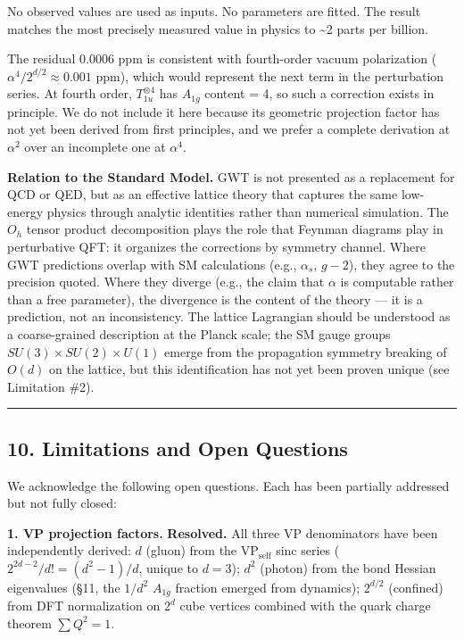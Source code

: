 \documentclass[
]{article}
\begin{document}
No observed values are used as inputs. No parameters are fitted. The
result matches the most precisely measured value in physics to
\textasciitilde2 parts per billion.

The residual 0.0006 ppm is consistent with fourth-order vacuum
polarization (\(\alpha^4/2^{d/2} \approx 0.001\) ppm), which would
represent the next term in the perturbation series. At fourth order,
\(T_{1u}^{\otimes 4}\) has \(A_{1g}\) content = 4, so such a correction
exists in principle. We do not include it here because its geometric
projection factor has not yet been derived from first principles, and we
prefer a complete derivation at \(\alpha^2\) over an incomplete one at
\(\alpha^4\).

\textbf{Relation to the Standard Model.} GWT is not presented as a
replacement for QCD or QED, but as an effective lattice theory that
captures the same low-energy physics through analytic identities rather
than numerical simulation. The \(O_h\) tensor product decomposition
plays the role that Feynman diagrams play in perturbative QFT: it
organizes the corrections by symmetry channel. Where GWT predictions
overlap with SM calculations (e.g., \(\alpha_s\), \(g-2\)), they agree
to the precision quoted. Where they diverge (e.g., the claim that
\(\alpha\) is computable rather than a free parameter), the divergence
is the content of the theory --- it is a prediction, not an
inconsistency. The lattice Lagrangian should be understood as a
coarse-grained description at the Planck scale; the SM gauge groups
\(SU(3) \times SU(2) \times U(1)\) emerge from the propagation symmetry
breaking of \(O(d)\) on the lattice, but this identification has not yet
been proven unique (see Limitation \#2).

\begin{center}\rule{0.5\linewidth}{0.5pt}\end{center}

\subsection{10. Limitations and Open
Questions}\label{limitations-and-open-questions}

We acknowledge the following open questions. Each has been partially
addressed but not fully closed:

\textbf{1. VP projection factors.} \textbf{Resolved.} All three VP
denominators have been independently derived: \(d\) (gluon) from the
VP\(_\text{self}\) sinc series (\(2^{2d-2}/d! = (d^2-1)/d\), unique to
\(d=3\)); \(d^2\) (photon) from the bond Hessian eigenvalues (§11, the
\(1/d^2\) \(A_{1g}\) fraction emerged from dynamics); \(2^{d/2}\)
(confined) from DFT normalization on \(2^d\) cube vertices combined with
the quark charge theorem \(\sum Q^2 = 1\).
\end{document}
